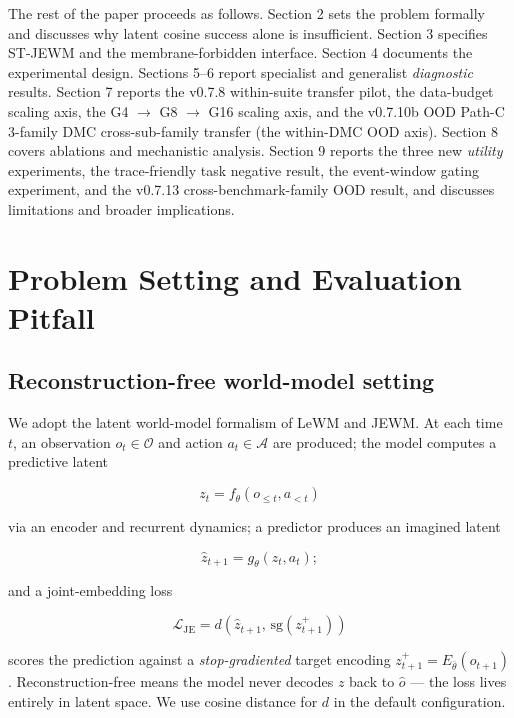 \documentclass{article}
\begin{document}
The rest of the paper proceeds as follows. Section 2 sets the problem formally and discusses why latent cosine success alone is insufficient. Section 3 specifies ST-JEWM and the membrane-forbidden interface. Section 4 documents the experimental design. Sections 5--6 report specialist and generalist \emph{diagnostic} results. Section 7 reports the v0.7.8 within-suite transfer pilot, the data-budget scaling axis, the G4 $\to$ G8 $\to$ G16 scaling axis, and the v0.7.10b OOD Path-C 3-family DMC cross-sub-family transfer (the within-DMC OOD axis). Section 8 covers ablations and mechanistic analysis. Section 9 reports the three new \emph{utility} experiments, the trace-friendly task negative result, the event-window gating experiment, and the v0.7.13 cross-benchmark-family OOD result, and discusses limitations and broader implications.

\section{Problem Setting and Evaluation Pitfall}

\subsection{Reconstruction-free world-model setting}

We adopt the latent world-model formalism of LeWM and JEWM. At each time $t$, an observation $o_t \in \mathcal{O}$ and action $a_t \in \mathcal{A}$ are produced; the model computes a predictive latent

\begin{equation}
z_t = f_\theta(o_{\leq t}, a_{<t})
\end{equation}

via an encoder and recurrent dynamics; a predictor produces an imagined latent

\begin{equation}
\hat{z}_{t+1} = g_\theta(z_t, a_t);
\end{equation}

and a joint-embedding loss

\begin{equation}
\mathcal{L}_{\mathrm{JE}} = d\!\left(\hat{z}_{t+1},\,\mathrm{sg}\!\left(z_{t+1}^{+}\right)\right)
\end{equation}

scores the prediction against a \emph{stop-gradiented} target encoding $z_{t+1}^{+} = E_{\bar\theta}(o_{t+1})$. Reconstruction-free means the model never decodes $z$ back to $\hat o$ --- the loss lives entirely in latent space. We use cosine distance for $d$ in the default configuration.
\end{document}
